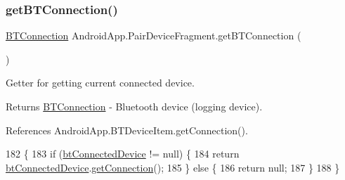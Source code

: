 \mbox{\label{class_android_app_1_1_pair_device_fragment_ae68bfed66a421a3020a257cbc034e42d}} 
\subsubsection{\texorpdfstring{get\+B\+T\+Connection()}{getBTConnection()}}
{\footnotesize\ttfamily \hyperlink{class_android_app_1_1_b_t_connection}{B\+T\+Connection} Android\+App.\+Pair\+Device\+Fragment.\+get\+B\+T\+Connection (\begin{DoxyParamCaption}{ }\end{DoxyParamCaption})\hspace{0.3cm}{\ttfamily [inline]}}



Getter for getting current connected device. 

\begin{DoxyReturn}{Returns}
\hyperlink{class_android_app_1_1_b_t_connection}{B\+T\+Connection} -\/ Bluetooth device (logging device). 
\end{DoxyReturn}


References Android\+App.\+B\+T\+Device\+Item.\+get\+Connection().


\begin{DoxyCode}
182     \{
183         \textcolor{keywordflow}{if} (\hyperlink{class_android_app_1_1_pair_device_fragment_ac3d93a383672355ed54c56dc3e21e827}{btConnectedDevice} != null) \{
184             \textcolor{keywordflow}{return} \hyperlink{class_android_app_1_1_pair_device_fragment_ac3d93a383672355ed54c56dc3e21e827}{btConnectedDevice}.\hyperlink{class_android_app_1_1_b_t_device_item_af256e53bf23dd3f969b14e0566a7b785}{getConnection}();
185         \} \textcolor{keywordflow}{else} \{
186             \textcolor{keywordflow}{return} null;
187         \}
188     \}
\end{DoxyCode}
\mbox{\label{class_android_app_1_1_pair_device_fragment_ac6569d8f68c8023f2c2d38da55260f29}} 
